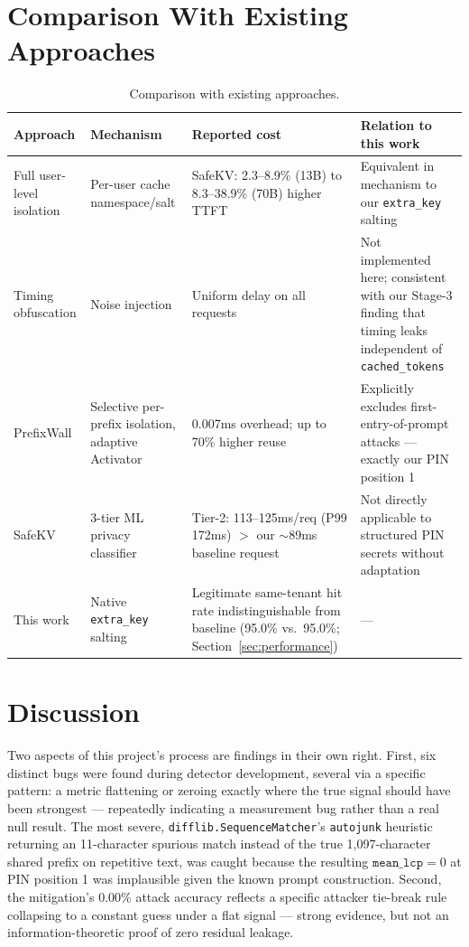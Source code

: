\documentclass[11pt]{article}
\begin{document}
\section{Comparison With Existing Approaches}
\label{sec:related-comparison}
\begin{table}[h]
\centering
\small
\begin{tabular}{@{}p{2.7cm}p{3.6cm}p{3.6cm}p{4.8cm}@{}}
\toprule
Approach & Mechanism & Reported cost & Relation to this work \\
\midrule
Full user-level isolation & Per-user cache namespace/salt & SafeKV: 2.3--8.9\% (13B) to 8.3--38.9\% (70B) higher TTFT & Equivalent in mechanism to our \texttt{extra\_key} salting \\
Timing obfuscation \citep{carlini2024remote} & Noise injection & Uniform delay on all requests & Not implemented here; consistent with our Stage-3 finding that timing leaks independent of \texttt{cached\_tokens} \\
PrefixWall \citep{pennas2026prefixwall} & Selective per-prefix isolation, adaptive Activator & 0.007ms overhead; up to 70\% higher reuse & Explicitly excludes first-entry-of-prompt attacks --- exactly our PIN position 1 \\
SafeKV \citep{chu2025safekv} & 3-tier ML privacy classifier & Tier-2: 113--125ms/req (P99 172ms) $>$ our $\sim$89ms baseline request & Not directly applicable to structured PIN secrets without adaptation \\
This work & Native \texttt{extra\_key} salting & Legitimate same-tenant hit rate indistinguishable from baseline (95.0\% vs.\ 95.0\%; Section~\ref{sec:performance}) & --- \\
\bottomrule
\end{tabular}
\caption{Comparison with existing approaches.}
\end{table}

\section{Discussion}
\label{sec:discussion}
Two aspects of this project's process are findings in their own right.
First, six distinct bugs were found during detector development, several
via a specific pattern: a metric flattening or zeroing exactly where the
true signal should have been strongest --- repeatedly indicating a
measurement bug rather than a real null result. The most severe,
\texttt{difflib.SequenceMatcher}'s \texttt{autojunk} heuristic returning
an 11-character spurious match instead of the true 1,097-character
shared prefix on repetitive text, was caught because the resulting
$\texttt{mean\_lcp}=0$ at PIN position 1 was implausible given the known
prompt construction. Second, the mitigation's 0.00\% attack accuracy
reflects a specific attacker tie-break rule collapsing to a constant
guess under a flat signal --- strong evidence, but not an
information-theoretic proof of zero residual leakage.
\end{document}
